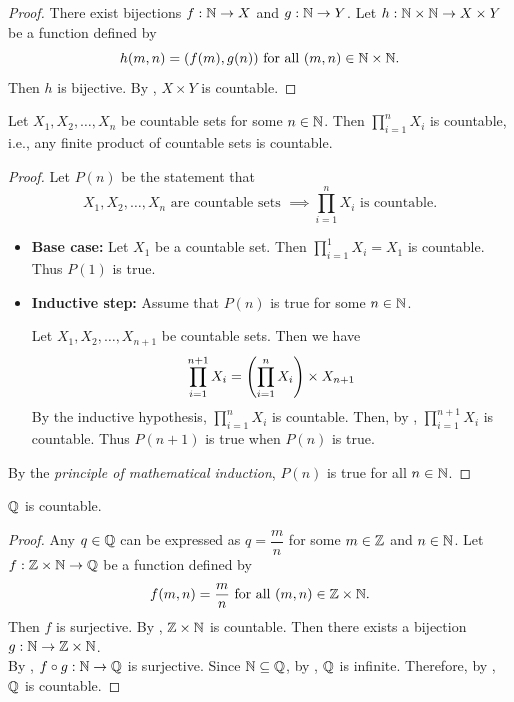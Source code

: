 \begin{proof}
    There exist bijections $f: \N \to X$ and $g: \N \to Y$. Let $h: \N \times \N \to X \times Y$ be a function defined by
    \[
    h(m, n) = (f(m), g(n)) \text{ for all } (m, n) \in \N \times \N.
    \]
    Then $h$ is bijective. By , $X \times Y$ is countable.
\end{proof}

\bigskip

\begin{theorem} \label{thm:ProductOfFiniteCountableSetsIsCountable}
    Let $X_{1}, X_{2}, \dots, X_{n}$ be countable sets for some $n \in \N$. Then $\displaystyle
    \prod_{i = 1}^{n} X_{i}$ is countable, i.e., any finite product of countable sets is countable.
\end{theorem}

\begin{proof}
    Let $P(n)$ be the statement that
    \[
    X_{1}, X_{2}, \dots, X_{n} \text{ are countable sets } \implies
    \displaystyle \prod_{i = 1}^{n} X_{i} \text{ is countable}.
    \]
    \begin{itemize}
        \item \textbf{Base case:} Let $X_{1}$ be a countable set. Then $\displaystyle \prod_{i = 1}^{1} X_{i} = X_{1}$
        is countable. Thus $P(1)$ is true.
        \item \textbf{Inductive step:} Assume that $P(n)$ is true for some $n \in \N$.
        
        Let $X_{1}, X_{2}, \dots, X_{n + 1}$ be countable sets. Then we have
        \[
        \prod_{i = 1}^{n + 1} X_{i} = \paren*{\prod_{i = 1}^{n} X_{i}} \times X_{n + 1}
        \]
        By the inductive hypothesis, $\displaystyle \prod_{i = 1}^{n} X_{i}$ is countable. Then, by
        , $\displaystyle \prod_{i = 1}^{n + 1} X_{i}$ is countable.
        Thus $P(n + 1)$ is true when $P(n)$ is true.
    \end{itemize}
    By the \emph{principle of mathematical induction},
    $P(n)$ is true for all $n \in \N$.
\end{proof}

\bigskip

\begin{theorem} \label{thm:QIsCountable}
    $\Q$ is countable.
\end{theorem}

\begin{proof}
    Any $q \in \Q$ can be expressed as $q = \dfrac{m}{n}$ for some $m \in \Z$ and $n \in \N$.
    Let $f: \Z \times \N \to \Q$ be a function defined by
    \[
    f(m, n) = \dfrac{m}{n} \text{ for all } (m, n) \in \Z \times \N.
    \]
    Then $f$ is surjective. By , $\Z \times \N$
    is countable. Then there exists a bijection $g: \N \to \Z \times \N$.
    \\[6mm]
    By , $f \circ g: \N \to \Q$ is surjective. Since $\N \subseteq \Q$,
    by , $\Q$ is infinite. Therefore,
    by , $\Q$ is countable.
\end{proof}

